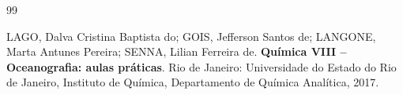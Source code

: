 \documentclass[a4paper,12pt]{article}
\begin{document}
\newpage
{}
{}
\begin{thebibliography}{99}

LAGO, Dalva Cristina Baptista do;
GOIS, Jefferson Santos de;
LANGONE, Marta Antunes Pereira;
SENNA, Lilian Ferreira de.
\textbf{Química VIII -- Oceanografia: aulas práticas}.
Rio de Janeiro: Universidade do Estado do Rio de Janeiro, Instituto de Química, Departamento de Química Analítica, 2017.

\end{thebibliography}
\end{document}
